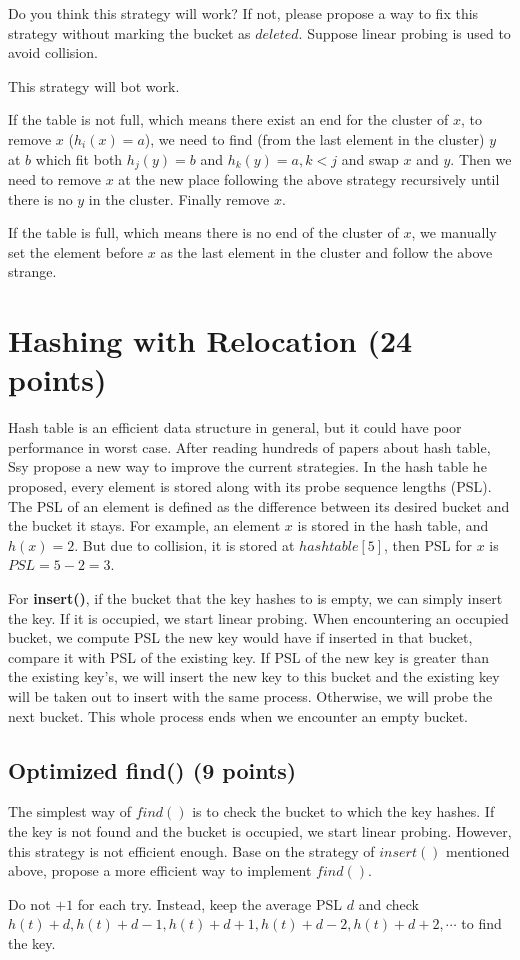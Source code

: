 \documentclass[11pt]{exam}
\begin{document}
Do you think this strategy will work? If not, please propose a way to fix this strategy without marking the bucket as $deleted$. Suppose linear probing is used to avoid collision.
\begin{solution}
    This strategy will bot work.

    If the table is not full, which means there exist an end for the cluster of $x$,
    to remove $x$ ($h_{i}(x) = a$), we need to find (from the last element in the cluster) $y$ at $b$ which fit both $h_j(y)=b$ and $h_{k}(y)=a, k<j$ and swap $x$ and $y$. Then we need to remove $x$ at the new place following the above strategy recursively until there is no $y$ in the cluster. Finally remove $x$.

    If the table is full, which means there is no end of the cluster of $x$, we manually set the element before $x$ as the last element in the cluster and follow the above strange.
\end{solution}

\section{Hashing with Relocation (24 points)}
Hash table is an efficient data structure in general, but it could have poor performance in worst case. After reading hundreds of papers about hash table, Ssy propose a new way to improve the current strategies. In the hash table he proposed, every element is stored along with its probe sequence lengths (PSL). The PSL of an element is defined as the difference between its desired bucket and the bucket it stays. For example, an element $x$ is stored in the hash table, and $h(x) = 2$. But due to collision, it is stored at $hashtable[5]$, then PSL for $x$ is $PSL = 5 - 2 = 3$. \par
For \textbf{insert()}, if the bucket that the key hashes to is empty, we can simply insert the key. If it is occupied, we start linear probing. When encountering an occupied bucket, we compute PSL the new key would have if inserted in that bucket, compare it with PSL of the existing key. If PSL of the new key is greater than the existing key's, we will insert the new key to this bucket and the existing key will be taken out to insert with the same process. Otherwise, we will probe the next bucket. This whole process ends when we encounter an empty bucket.
\subsection{Optimized find() (9 points)}
The simplest way of $find()$ is to check the bucket to which the key hashes. If the key is not found and the bucket is occupied, we start linear probing. However, this strategy is not efficient enough. Base on the strategy of $insert()$ mentioned above, propose a more efficient way to implement $find()$.
\begin{solution}
    Do not $+1$ for each try. Instead, keep the average PSL $d$ and check $h(t)+d,h(t)+d-1,h(t)+d+1,h(t)+d-2,h(t)+d+2,\cdots$ to find the key.
\end{solution}
\end{document}
